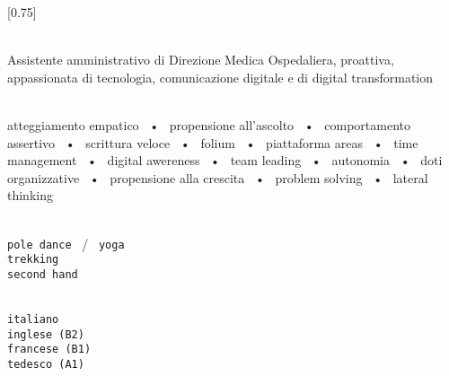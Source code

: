 \documentclass[lighthipster]{simple-hipster}
\begin{document}
\setlength{\columnsep}{1.5cm}
[0.75]
\begin{paracol}{2}

\paracolbackgroundoptions



\footnotesize
{\setasidefontcolour
\flushright
\begin{center}
\end{center}

\\[0.5em]

{
  \footnotesize
  Assistente amministrativo di Direzione Medica Ospedaliera, proattiva, appassionata di tecnologia, comunicazione digitale e di digital transformation
}
\bigskip

%
%
%

%
%



\bigskip

\\[0.5em]

atteggiamento empatico ~•~ propensione all'ascolto ~•~ comportamento assertivo ~•~ scrittura veloce ~•~ folium ~•~ piattaforma areas ~•~ time management ~•~ digital awereness ~•~ team leading ~•~ autonomia ~•~ doti organizzative ~•~ propensione alla crescita ~•~ problem solving ~•~ lateral thinking

\bigskip

\\[0.5em]

\texttt{pole dance} ~/~ \texttt{yoga} \\
\texttt{trekking} \\
\texttt{second hand} \\

\bigskip

\\[0.5em]

\texttt{italiano} \\
\texttt{inglese (B2)} \\
\texttt{francese (B1)} \\
\texttt{tedesco (A1)} \\

}
\end{paracol}
\end{document}
